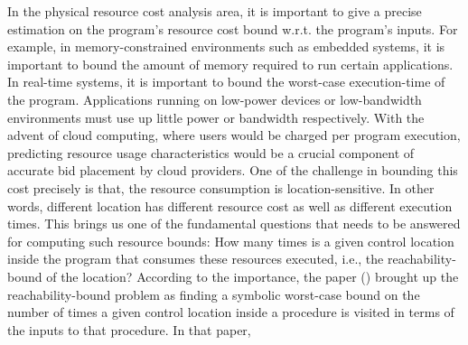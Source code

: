 In the physical resource cost analysis area, it is important to give a precise estimation
on the program's resource cost bound w.r.t. the program's inputs.
For example, in memory-constrained environments such as embedded systems,
it is important to bound the amount of memory required to run certain applications.
In real-time systems, it is important to bound the worst-case execution-time of the program.
Applications running on low-power devices or low-bandwidth environments must use up little power or bandwidth respectively. 
With the advent of cloud computing, where users would be charged per program execution,
predicting resource usage characteristics would be a crucial component of accurate bid placement by cloud providers. 
One of the challenge in bounding this cost precisely is that, the resource consumption is location-sensitive.
In other words, different location has different resource cost as well as different execution times.
This brings us one of the fundamental questions that needs to be answered for computing such resource bounds:
How many times is a given control location inside the program that consumes these resources executed, i.e., the
reachability-bound of the location?
According to the importance, the paper (\cite{GulwaniZ10}) brought up the reachability-bound problem as
finding a symbolic worst-case bound on the number of times a given control location 
inside a procedure is visited in terms of the inputs to that procedure.
    In that paper,
